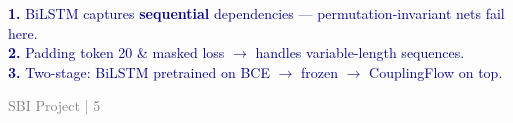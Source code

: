 \documentclass[aspectratio=169,10pt]{beamer}
\begin{document}
\begin{frame}[plain]
\begin{minipage}{0.90\textwidth}
\vspace{0.14cm}

\begin{center}
{\fontsize{7.0}{8.5}\selectfont
\textcolor{navy}{
\textbf{1.} BiLSTM captures \textbf{sequential} dependencies — permutation-invariant nets fail here.\\[6pt]
\textbf{2.} Padding token 20 \& masked loss $\to$ handles variable-length sequences.\\[6pt]
\textbf{3.} Two-stage: BiLSTM pretrained on BCE $\to$ frozen $\to$ CouplingFlow on top.
}}
\end{center}

\vspace{0.06cm}


\end{minipage}

\vfill
\hspace{0.95cm}
{\fontsize{5.5}{6.0}\selectfont\textcolor{gray}{SBI Project | 5}}
\vspace{0.26cm}

\end{frame}
\end{document}
